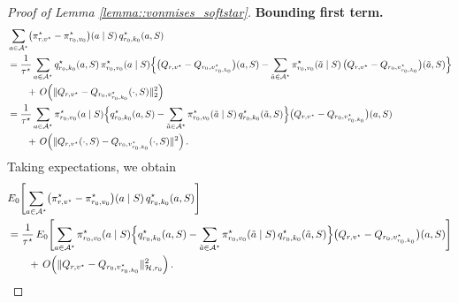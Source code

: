 \documentclass[11pt]{article}
\theoremstyle{plain}
\begin{document}
\begin{proof}[Proof of Lemma \ref{lemma::vonmises_softstar}]
\noindent \textbf{Bounding first term.}
\begin{align*}
&\sum_{a \in \mathcal{A}^\star} \bigl(\pi_{r,v^\star}^\star - \pi_{r_0,v_0}^\star\bigr)(a \mid S)\, q_{r_0,k_0}^\star(a,S)\\
&= \frac{1}{\tau^\star} \sum_{a \in \mathcal{A}^\star} q_{r_0,k_0}^\star(a,S)\,\pi_{r_0,v_0}^\star(a \mid S)
   \Bigl\{ \bigl(Q_{r,v^\star} - Q_{r_0,v_{r_0,k_0}^\star}\bigr)(a,S)
           - \sum_{\tilde a \in \mathcal{A}^\star} \pi_{r_0,v_0}^\star(\tilde a \mid S)\,
             \bigl(Q_{r,v^\star}- Q_{r_0,v_{r_0,k_0}^\star}\bigr)(\tilde a,S)
   \Bigr\}  \\
&\qquad +\, O\!\left(\|Q_{r,v^\star}- Q_{r_0,v_{r_0,k_0}^\star}(\cdot, S)\|_2^2\right) \\
&= \frac{1}{\tau^\star} \sum_{a \in \mathcal{A}^\star} \pi_{r_0,v_0}^\star(a \mid S)
   \Bigl\{ q_{r_0,k_0}^\star(a,S) - \sum_{\tilde a \in \mathcal{A}^\star} \pi_{r_0,v_0}^\star(\tilde a \mid S)\, q_{r_0,k_0}^\star(\tilde a,S) \Bigr\}
   \bigl(Q_{r,v^\star} - Q_{r_0,v_{r_0,k_0}^\star}\bigr)(a,S) \\
&\qquad +\, O\!\left(\|Q_{r,v^\star}(\cdot,S) - Q_{r_0,v_{r_0,k_0}^\star}(\cdot,S)\|^2\right).
\end{align*}
Taking expectations, we obtain
\begin{align*}
& E_0\!\left[\sum_{a \in \mathcal{A}^\star} \bigl(\pi_{r,v^\star}^\star - \pi_{r_0,v_0}^\star\bigr)(a \mid S)\, q_{r_0,k_0}^\star(a,S)\right]\\
&= \frac{1}{\tau^\star}\,
E_0\!\left[\sum_{a \in \mathcal{A}^\star} \pi_{r_0,v_0}^\star(a \mid S)
   \Bigl\{ q_{r_0,k_0}^\star(a,S) - \sum_{\tilde a \in \mathcal{A}^\star} \pi_{r_0,v_0}^\star(\tilde a \mid S)\, q_{r_0,k_0}^\star(\tilde a,S) \Bigr\}
   \bigl(Q_{r,v^\star} - Q_{r_0,v_{r_0,k_0}^\star}\bigr)(a,S)\right] \\
&\qquad +\, O\!\left(\|Q_{r,v^\star} - Q_{r_0,v_{r_0,k_0}^\star}\|^2_{\mathcal{H},r_0}\right).
\end{align*}






\end{proof}
\end{document}
